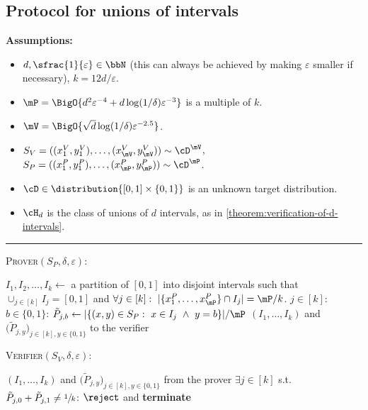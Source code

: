 \begin{minipage}{\textwidth}
\subsection{Protocol for unions of intervals}\label{appendix:union-of-intervals}

\vspace{-0.25cm}
\begin{protocol}[H]
	\begin{ShadedAlgorithmBox}
		{\bfseries Assumptions:} 
		\begin{itemize}	
			\item{$d,\sfrac{1}{\varepsilon} \in \bbN$ (this can always be achieved by making $\varepsilon$ smaller if necessary), $k = 12d/\varepsilon$.}
				\item{$\mP = \BigO{d^2\varepsilon^{-4}	+ d\log(1/\delta)\varepsilon^{-3}}$ is a multiple of $k$.}
				\item{$\mV = \BigO{\sqrt{d}\log(1/\delta)\varepsilon^{-2.5}}$.}
			\item{
				$S_V = ((x_1^V,y_1^V),\dots,(x_{\mV}^V,y_{\mV}^V)) \sim \cD^{\mV}$, $S_P = ((x_1^P,y_1^P),\dots,(x_{\mP}^P,y_{\mP}^P)) \sim \cD^{\mP}$.
			}
			\item{
				$\cD \in \distribution{[0,1]\times \{0,1\}}$ is an unknown target distribution.
			}
			\item{
				$\cH_d$ is the class of unions of $d$ intervals, as in \cref{theorem:verification-of-d-intervals}.
			}
		\end{itemize}

		\noindent\rule{\textwidth}{0.5pt}

		\vsp

		\textsc{Prover}$(S_P,\delta,\varepsilon)$:
		\begin{algorithmic}
			\State $I_1,I_2,\dots,I_k \gets$ a partition of $[0,1]$ into disjoint intervals such that $\cup_{j \in [k]} I_j = [0,1]$
			\State \hfil and $\forall j \in [k]: ~ |\{x_1^P,\dots,x_{\mP}^P\}\cap I_j| = \mP/k$. \hfil
			\vsp
			\For $j \in [k]$:
				\For $b \in \{0,1\}$:
					\State $\tilde{P}_{j,b} \gets |\{(x,y) \in S_P: ~ x \in I_j ~ \land ~ y = b\}| / \mP$
				\EndFor
			\EndFor
			 $\left(I_1,\dots,I_k\right)$ and $\big(\tilde{P}_{j,y}\big)_{j \in [k], y \in \{0,1\}}$ to the verifier
		\end{algorithmic}

		\vsp

		\textsc{Verifier}$(S_V,\delta,\varepsilon)$:	
		\begin{algorithmic}
			 $\left(I_1,\dots,I_k\right)$ and $\big(\tilde{P}_{j,y}\big)_{j \in [k], y \in \{0,1\}}$ from the prover
			\vsp
			\If $\exists j \in [k]$ s.t. $\tilde{P}_{j,0} + \tilde{P}_{j,1} \neq \sfrac{1}{k}$:
				 $\reject$ and {\bfseries terminate} 
			\EndIf


\end{algorithmic}
\end{ShadedAlgorithmBox}
\end{protocol}
\end{minipage}
